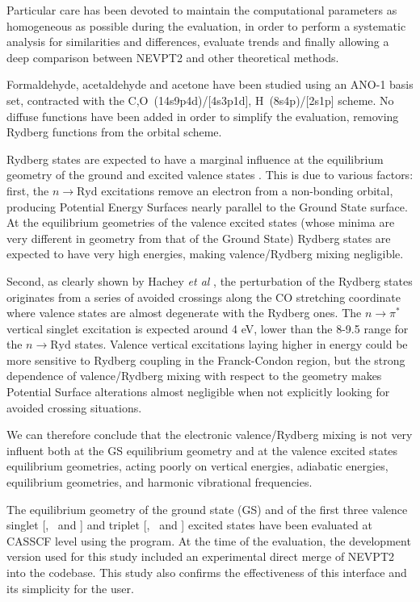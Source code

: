 Particular care has been devoted to maintain the computational parameters as
homogeneous as possible during the evaluation, in order to perform a
systematic analysis for similarities and differences, evaluate trends and
finally allowing a deep comparison between NEVPT2 and other theoretical
methods. 

Formaldehyde, acetaldehyde and acetone have been studied using an
\mbox{ANO-1} basis set\cite{tca-77-291-1990}, contracted with the \mbox{C,O
(14s9p4d)/[4s3p1d]}, \mbox{H (8s4p)/[2s1p]} scheme. No diffuse functions have been
added in order to simplify the evaluation, removing Rydberg functions from
the orbital scheme. 

Rydberg states are expected to have a marginal influence at the equilibrium
geometry of the ground and excited valence states \cite{tca-92-227-1995}.
This is due to various factors: first, the $n \rightarrow \mbox{Ryd}$ excitations
remove an electron from a non-bonding orbital, producing Potential Energy
Surfaces nearly parallel to the Ground State surface. At the equilibrium
geometries of the valence excited states (whose minima are very
different in geometry from that of the Ground State) Rydberg states are
expected to have very high energies, making valence/Rydberg mixing
negligible. 

Second, as clearly shown by Hachey {\it et al}
\cite{jpc-99-8050-1995,jms-176-375-1996}, the perturbation of the Rydberg
states originates from a series of avoided crossings along the CO stretching
coordinate  where valence states are almost degenerate with the Rydberg ones. 
The $n \rightarrow \pi^{*}$ vertical singlet excitation is expected
around 4 eV, lower than the 8-9.5 range for the $n \rightarrow \mbox{Ryd}$
states. Valence vertical excitations laying higher in energy could be more
sensitive to Rydberg coupling in the Franck-Condon region, but the strong
dependence of valence/Rydberg mixing with respect to the geometry makes
Potential Surface alterations almost negligible when not explicitly looking
for avoided crossing situations.

We can therefore conclude that the electronic valence/Rydberg mixing is not
very influent both at the GS equilibrium geometry and at the valence excited
states equilibrium geometries, acting poorly on vertical energies, adiabatic
energies, equilibrium geometries, and harmonic vibrational frequencies.

The equilibrium geometry of the ground state (GS) and of the first three
valence singlet [\snpi, \spipi \, and \sspi] and triplet [\tnpi, \tpipi \, and
\tspi] excited states have been evaluated at CASSCF level using the \dalton
program\cite{dalton-site}. At the time of the evaluation, the development
version used for this study included an experimental direct merge of NEVPT2
into the \dalton codebase. This study also confirms the effectiveness of
this interface and its simplicity for the user.

